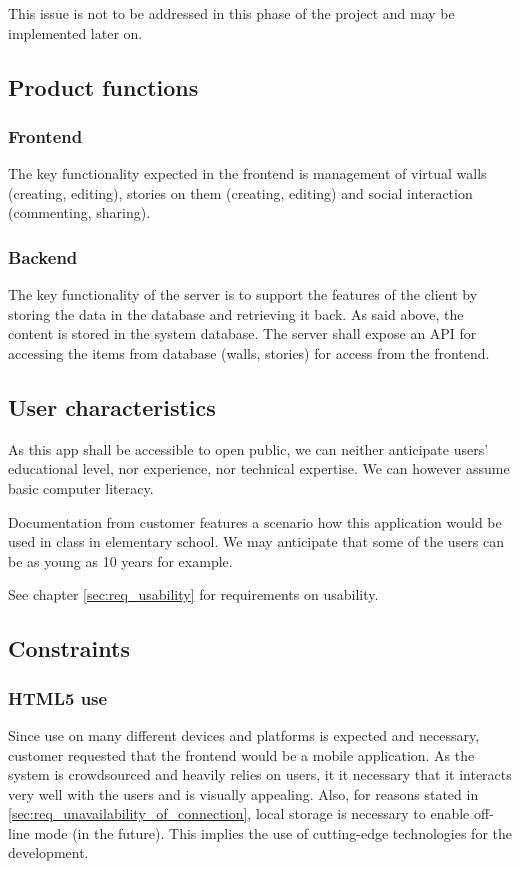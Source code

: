 \documentclass[11pt]{book}
\begin{document}
This issue is not to be addressed in this phase of the project and may be implemented later on.

\subsection{Product functions}

\subsubsection{Frontend}
The key functionality expected in the frontend is management of virtual walls (creating, editing), stories on them (creating, editing) and social interaction (commenting, sharing).

\subsubsection{Backend}
The key functionality of the server is to support the features of the client by storing the data in the database and retrieving it back. As said above, the content is stored in the system database. The server shall expose an API for accessing the items from database (walls, stories) for access from the frontend.

\subsection{User characteristics} \label{sec:req_user_characteristics}
As this app shall be accessible to open public, we can neither anticipate users' educational level, nor experience, nor technical expertise. We can however assume basic computer literacy.

Documentation from customer features a scenario how this application would be used in class in elementary school. We may anticipate that some of the users can be as young as 10 years for example.

See chapter \ref{sec:req_usability} for requirements on usability.

\subsection{Constraints}

\subsubsection{HTML5 use}
Since use on many different devices and platforms is expected and necessary, customer requested that the frontend would be a mobile application. As the system is crowdsourced and heavily relies on users, it it necessary that it interacts very well with the users and is visually appealing. Also, for reasons stated in \ref{sec:req_unavailability_of_connection}, local storage is necessary to enable off-line mode (in the future). This implies the use of cutting-edge technologies for the development.
\end{document}
